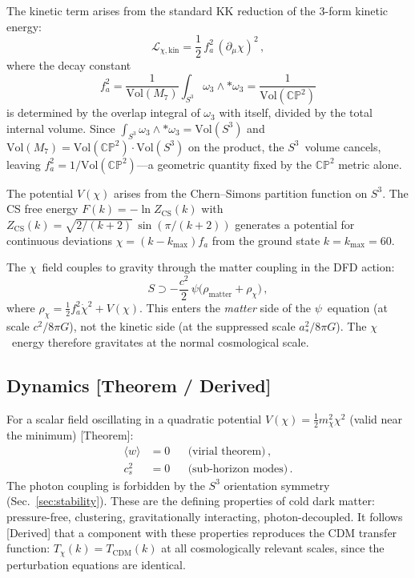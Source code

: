 \documentclass[aps,prd,twocolumn,superscriptaddress,showpacs,floatfix,nofootinbib]{revtex4-2}
\theoremstyle{definition}
\theoremstyle{remark}
\newcommand{\CP}{\mathbb{CP}}
\newcommand{\Sph}{S}
\newcommand{\astar}{a_*}
\newcommand{\kmax}{k_{\max}}
\newcommand{\grade}[1]{\textsf{\footnotesize [#1]}}
\begin{document}
The kinetic term arises from the standard KK reduction of
the $3$-form kinetic energy:
\begin{equation}
\label{eq:chi-kinetic}
\mathcal{L}_{\chi,\mathrm{kin}}
= \frac{1}{2}\,f_a^2\,(\partial_\mu\chi)^2\,,
\end{equation}
where the decay constant
\begin{equation}
\label{eq:fa-def}
f_a^2 = \frac{1}{\mathrm{Vol}(M_7)}
\int_{\Sph^3}\omega_3\wedge{*}\omega_3
= \frac{1}{\mathrm{Vol}(\CP^2)}
\end{equation}
is determined by the overlap integral of $\omega_3$ with
itself, divided by the total internal volume. Since
$\int_{\Sph^3}\omega_3\wedge{*}\omega_3 = \mathrm{Vol}(\Sph^3)$
and $\mathrm{Vol}(M_7) = \mathrm{Vol}(\CP^2)\cdot
\mathrm{Vol}(\Sph^3)$ on the product, the $\Sph^3$~volume
cancels, leaving $f_a^2 = 1/\mathrm{Vol}(\CP^2)$---a
geometric quantity fixed by the $\CP^2$ metric alone.

The potential $V(\chi)$ arises from the Chern--Simons
partition function on $\Sph^3$. The CS free energy
$F(k) = -\ln Z_{\mathrm{CS}}(k)$ with
$Z_{\mathrm{CS}}(k) = \sqrt{2/(k{+}2)}\,\sin(\pi/(k{+}2))$
generates a potential for continuous deviations
$\chi = (k-\kmax)f_a$ from the ground state $k=\kmax=60$.

The $\chi$~field couples to gravity through the matter
coupling in the DFD action:
\begin{equation}
S \supset -\frac{c^2}{2}\,\psi\bigl(\rho_{\mathrm{matter}}
+ \rho_\chi\bigr)\,,
\end{equation}
where $\rho_\chi = \frac{1}{2}f_a^2\dot\chi^2
+ V(\chi)$. This enters the \emph{matter} side of the
$\psi$~equation (at scale $c^2/8\pi G$), not the
kinetic side (at the suppressed scale $\astar^2/8\pi G$).
The $\chi$~energy therefore gravitates at the normal
cosmological scale.

\subsection{Dynamics \grade{Theorem / Derived}}

For a scalar field oscillating in a quadratic potential
$V(\chi) = \frac{1}{2}m_\chi^2\chi^2$ (valid near the
minimum) \grade{Theorem}:
\begin{align}
\langle w\rangle &= 0
  &&\text{(virial theorem)}\,,\\
c_s^2 &= 0
  &&\text{(sub-horizon modes)}\,.
\end{align}
The photon coupling is forbidden by the $\Sph^3$
orientation symmetry (Sec.~\ref{sec:stability}).
These are the defining properties of cold dark matter:
pressure-free, clustering, gravitationally interacting,
photon-decoupled. It follows \grade{Derived} that a
component with these properties reproduces the CDM
transfer function: $T_\chi(k) = T_{\mathrm{CDM}}(k)$
at all cosmologically relevant scales, since the
perturbation equations are identical.
\end{document}
